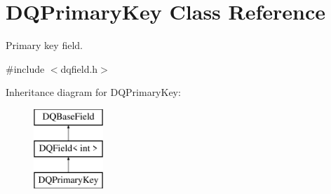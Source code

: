 \hypertarget{classDQPrimaryKey}{
\section{DQPrimaryKey Class Reference}
\label{classDQPrimaryKey}
}


Primary key field.  




{\ttfamily \#include $<$dqfield.h$>$}

Inheritance diagram for DQPrimaryKey:\begin{figure}[H]
\begin{center}
\leavevmode
\includegraphics[height=3.000000cm]{classDQPrimaryKey}
\end{center}
\end{figure}
